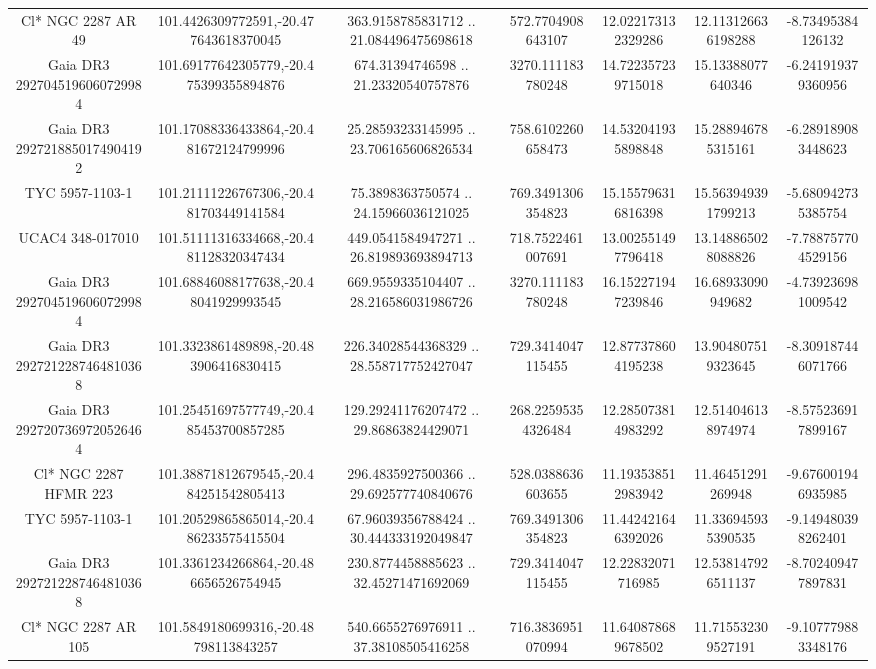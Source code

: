 \begin{table}
\begin{tabular}{ccccccc}
Cl* NGC 2287     AR      49 & 101.4426309772591,-20.477643618370045 & 363.9158785831712 .. 21.084496475698618 & 572.7704908643107 & 12.022173132329286 & 12.113126636198288 & -8.73495384126132 \\
Gaia DR3 2927045196060729984 & 101.69177642305779,-20.475399355894876 & 674.31394746598 .. 21.23320540757876 & 3270.111183780248 & 14.722357239715018 & 15.13388077640346 & -6.241919379360956 \\
Gaia DR3 2927218850174904192 & 101.17088336433864,-20.481672124799996 & 25.28593233145995 .. 23.706165606826534 & 758.6102260658473 & 14.532041935898848 & 15.288946785315161 & -6.289189083448623 \\
TYC 5957-1103-1 & 101.21111226767306,-20.481703449141584 & 75.3898363750574 .. 24.15966036121025 & 769.3491306354823 & 15.155796316816398 & 15.563949391799213 & -5.680942735385754 \\
UCAC4 348-017010 & 101.51111316334668,-20.481128320347434 & 449.0541584947271 .. 26.819893693894713 & 718.7522461007691 & 13.002551497796418 & 13.148865028088826 & -7.788757704529156 \\
Gaia DR3 2927045196060729984 & 101.68846088177638,-20.48041929993545 & 669.9559335104407 .. 28.216586031986726 & 3270.111183780248 & 16.152271947239846 & 16.68933090949682 & -4.739236981009542 \\
Gaia DR3 2927212287464810368 & 101.3323861489898,-20.483906416830415 & 226.34028544368329 .. 28.558717752427047 & 729.3414047115455 & 12.877378604195238 & 13.904807519323645 & -8.309187446071766 \\
Gaia DR3 2927207369720526464 & 101.25451697577749,-20.485453700857285 & 129.29241176207472 .. 29.86863824429071 & 268.22595354326484 & 12.285073814983292 & 12.514046138974974 & -8.575236917899167 \\
Cl* NGC 2287   HFMR     223 & 101.38871812679545,-20.484251542805413 & 296.4835927500366 .. 29.692577740840676 & 528.0388636603655 & 11.193538512983942 & 11.46451291269948 & -9.676001946935985 \\
TYC 5957-1103-1 & 101.20529865865014,-20.486233575415504 & 67.96039356788424 .. 30.444333192049847 & 769.3491306354823 & 11.442421646392026 & 11.336945935390535 & -9.149480398262401 \\
Gaia DR3 2927212287464810368 & 101.3361234266864,-20.486656526754945 & 230.8774458885623 .. 32.45271471692069 & 729.3414047115455 & 12.22832071716985 & 12.538147926511137 & -8.702409477897831 \\
Cl* NGC 2287     AR     105 & 101.5849180699316,-20.48798113843257 & 540.6655276976911 .. 37.38108505416258 & 716.3836951070994 & 11.640878689678502 & 11.715532309527191 & -9.107779883348176 \\

\end{tabular}
\end{table}
